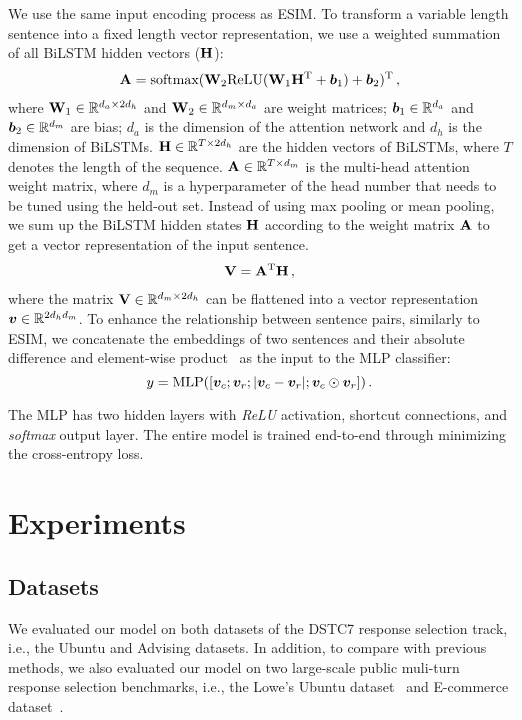 \documentclass[letterpaper]{article} \usepackage{aaai19}  \usepackage{times}  \usepackage{helvet}  \usepackage{courier}  \usepackage{url}  \usepackage{graphicx}
\newcommand{\mat}[1]{\bf{#1}}
\newcommand{\RR}{\mathbb{R}}
\begin{document}
We use the same input encoding process as ESIM. To transform a variable length sentence into a fixed length vector representation, we use a weighted summation of all BiLSTM hidden vectors (${\mat H}$): 
\begin{align}
{\mat A} = \text{softmax}({\mat W}_2\text{ReLU}({\mat W}_1 {\mat H}^\mathrm{T} + {\vect b_1} ) + {\vect b_2})^\mathrm{T} \,,
\end{align} 
\noindent where ${\mat W}_1 \in \RR^{d_a \times 2d_h}$ and ${\mat W}_2 \in \RR^{d_m \times d_a}$ are weight matrices; ${\vect b_1} \in \RR^{d_a}$ and ${\vect b_2} \in \RR^{d_m}$ are bias; $d_a$ is the dimension of the attention network and $d_h$ is the dimension of BiLSTMs. ${\mat H} \in \RR^{T \times 2d_h}$ are the hidden vectors of BiLSTMs, where $T$ denotes the length of the sequence. ${\mat A} \in \RR^{T \times d_m}$ is the multi-head attention weight matrix, where $d_m$ is a hyperparameter of the head number that needs to be tuned using the held-out set. Instead of using max pooling or mean pooling, we sum up the BiLSTM hidden states ${\mat H}$ according to the weight matrix ${\mat A}$ to get a vector representation of the input sentence.
\begin{align}
{\mat V} =  {\mat A}^\mathrm{T}{\mat H} \,,
\end{align} 
\noindent where the matrix ${\mat V} \in \RR^{d_m \times 2d_h}$ can be flattened into a vector representation ${\vect v} \in \RR^{2d_h d_m }$. To enhance the relationship between sentence pairs, similarly to ESIM, we concatenate the embeddings of two sentences and their absolute difference and element-wise product~\cite{DBLP:conf/acl/MouMLX0YJ16} as the input to the MLP classifier:
\begin{equation}
y = \mathrm{MLP}([{\bm{v}}_c;{\bm{v}}_r;\lvert{\bm{v}}_c - {\bm{v}}_r\rvert; {\bm{v}}_c \odot {\bm{v}}_r]) \,.
\end{equation}
 
The MLP has two hidden layers with \textit{ReLU} activation, shortcut connections, and \textit{softmax} output layer. The entire model is trained end-to-end through minimizing the cross-entropy loss. 

\section{Experiments}
\subsection{Datasets}
We evaluated our model on both datasets of the DSTC7 response selection track, i.e., the Ubuntu and Advising datasets. In addition, to compare with previous methods, we also evaluated our model on two large-scale public muli-turn response selection benchmarks, i.e., the Lowe's Ubuntu dataset~\cite{DBLP:conf/sigdial/LowePSP15} and E-commerce dataset~\cite{DBLP:conf/coling/ZhangLZZL18}.
\end{document}
